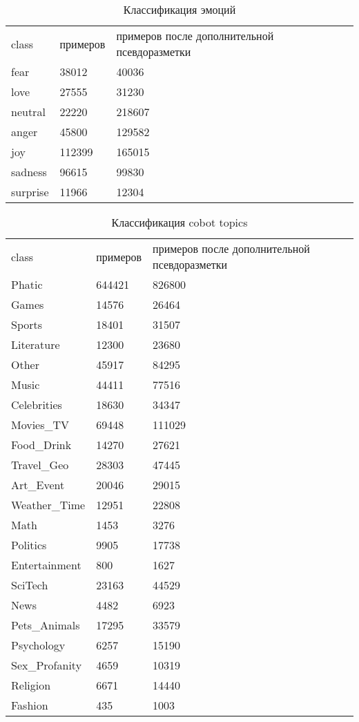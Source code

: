 \begin{table}[]
\caption{Классификация эмоций}
\label{appendix:emo}
\begin{tabular}{lll}
class & примеров & примеров после дополнительной псевдоразметки \\
fear & 38012 & {40036} \\
love & 27555 & {31230} \\
neutral & 22220 & {218607} \\
anger & 45800 & 129582 \\
joy & 112399 & 165015 \\
sadness & 96615 & 99830 \\
surprise & 11966 & 12304
\end{tabular}
\end{table}


\begin{table}[]
\caption{Классификация cobot topics}
\label{appendix:ct}
\begin{tabular}{lll}
class & примеров & примеров после дополнительной псевдоразметки \\
Phatic & 644421 & {826800} \\
Games & 14576 & {26464} \\
Sports & 18401 & {31507} \\
Literature & 12300 & 23680 \\
Other & 45917 & 84295 \\
Music & 44411 & 77516 \\
Celebrities & 18630 & 34347 \\
Movies\_TV & 69448 & 111029 \\
Food\_Drink & 14270 & 27621 \\
Travel\_Geo & 28303 & 47445 \\
Art\_Event & 20046 & 29015 \\
Weather\_Time & 12951 & 22808 \\
Math & 1453 & 3276 \\
Politics & 9905 & 17738 \\
Entertainment & 800 & 1627 \\
SciTech & 23163 & 44529 \\
News & 4482 & 6923 \\
Pets\_Animals & 17295 & 33579 \\
Psychology & 6257 & 15190 \\
Sex\_Profanity & 4659 & 10319 \\
Religion & 6671 & 14440 \\
Fashion & 435 & 1003
\end{tabular}
\end{table}


